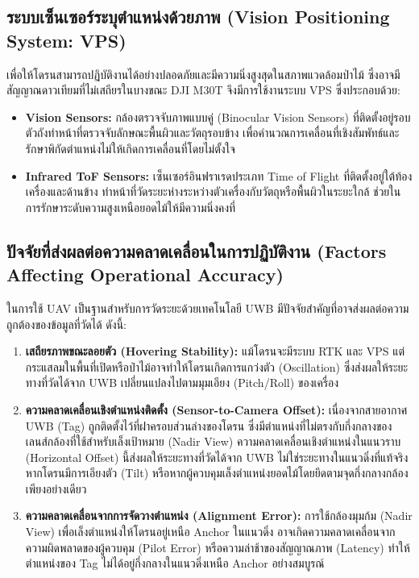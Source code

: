 \subsection{ระบบเซ็นเซอร์ระบุตำแหน่งด้วยภาพ (Vision Positioning System: VPS)}
เพื่อให้โดรนสามารถปฏิบัติงานได้อย่างปลอดภัยและมีความนิ่งสูงสุดในสภาพแวดล้อมป่าไม้ ซึ่งอาจมีสัญญาณดาวเทียมที่ไม่เสถียรในบางขณะ DJI M30T จึงมีการใช้งานระบบ VPS ซึ่งประกอบด้วย:
\begin{itemize}
        \item \textbf{Vision Sensors:} กล้องตรวจจับภาพแบบคู่ (Binocular Vision Sensors) ที่ติดตั้งอยู่รอบตัวถังทำหน้าที่ตรวจจับลักษณะพื้นผิวและวัตถุรอบข้าง เพื่อคำนวณการเคลื่อนที่เชิงสัมพัทธ์และรักษาพิกัดตำแหน่งไม่ให้เกิดการเคลื่อนที่โดยไม่ตั้งใจ
        \item \textbf{Infrared ToF Sensors:} เซ็นเซอร์อินฟราเรดประเภท Time of Flight ที่ติดตั้งอยู่ใต้ท้องเครื่องและด้านข้าง ทำหน้าที่วัดระยะห่างระหว่างตัวเครื่องกับวัตถุหรือพื้นผิวในระยะใกล้ ช่วยในการรักษาระดับความสูงเหนือยอดไม้ให้มีความนิ่งคงที่ \cite{dji_m30t_specs}
\end{itemize}

\subsection{ปัจจัยที่ส่งผลต่อความคลาดเคลื่อนในการปฏิบัติงาน (Factors Affecting Operational Accuracy)}
ในการใช้ UAV เป็นฐานสำหรับการวัดระยะด้วยเทคโนโลยี UWB มีปัจจัยสำคัญที่อาจส่งผลต่อความถูกต้องของข้อมูลที่วัดได้ ดังนี้:

\begin{enumerate}
    \item \textbf{เสถียรภาพขณะลอยตัว (Hovering Stability):} แม้โดรนจะมีระบบ RTK และ VPS แต่กระแสลมในพื้นที่เปิดหรือป่าไม้อาจทำให้โดรนเกิดการแกว่งตัว (Oscillation) ซึ่งส่งผลให้ระยะทางที่วัดได้จาก UWB เปลี่ยนแปลงไปตามมุมเอียง (Pitch/Roll) ของเครื่อง \cite{stewart2022drone}
    \item \textbf{ความคลาดเคลื่อนเชิงตำแหน่งติดตั้ง (Sensor-to-Camera Offset):} เนื่องจากสายอากาศ UWB (Tag) ถูกติดตั้งไว้ที่ฝาครอบส่วนล่างของโดรน ซึ่งมีตำแหน่งที่ไม่ตรงกับกึ่งกลางของเลนส์กล้องที่ใช้สำหรับเล็งเป้าหมาย (Nadir View) ความคลาดเคลื่อนเชิงตำแหน่งในแนวราบ (Horizontal Offset) นี้ส่งผลให้ระยะทางที่วัดได้จาก UWB ไม่ใช่ระยะทางในแนวดิ่งที่แท้จริงหากโดรนมีการเอียงตัว (Tilt) หรือหากผู้ควบคุมเล็งตำแหน่งยอดไม้โดยยึดตามจุดกึ่งกลางกล้องเพียงอย่างเดียว \cite{stewart2022drone}
    \item \textbf{ความคลาดเคลื่อนจากการจัดวางตำแหน่ง (Alignment Error):} การใช้กล้องมุมก้ม (Nadir View) เพื่อเล็งตำแหน่งให้โดรนอยู่เหนือ Anchor ในแนวดิ่ง อาจเกิดความคลาดเคลื่อนจากความผิดพลาดของผู้ควบคุม (Pilot Error) หรือความล่าช้าของสัญญาณภาพ (Latency) ทำให้ตำแหน่งของ Tag ไม่ได้อยู่กึ่งกลางในแนวดิ่งเหนือ Anchor อย่างสมบูรณ์ \cite{pajares2015overview}
\end{enumerate}

